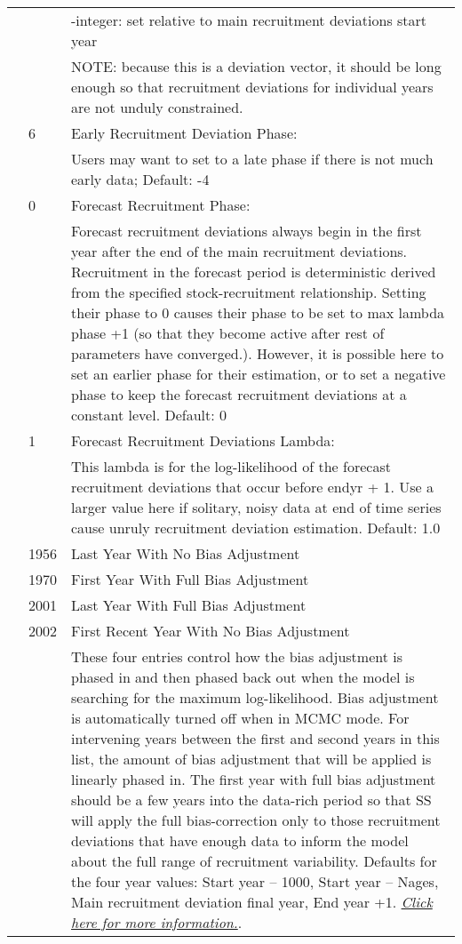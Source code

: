 \begin{center}
\begin{longtable}{p{1cm} p{3cm} p{11cm}}
		&  & -integer:  set relative to main recruitment deviations start year\\
		&  & NOTE:  because this is a deviation vector, it should be long enough so that recruitment deviations for individual years are not unduly constrained. \\
		& 6 & Early Recruitment Deviation Phase: \\
		& & Users may want to set to a late phase if there is not much early data; Default:  -4\\
		& 0 & Forecast Recruitment Phase: \\
		& & Forecast recruitment deviations always begin in the first year after the end of the main recruitment deviations. Recruitment in the forecast period is deterministic derived from the specified stock-recruitment relationship.  Setting their phase to 0 causes their phase to be set to max lambda phase +1 (so that they become active after rest of parameters have converged.).  However, it is possible here to set an earlier phase for their estimation, or to set a negative phase to keep the forecast recruitment deviations at a constant level. Default:  0 \\
		& 1 & Forecast Recruitment Deviations Lambda:\\
		&   & This lambda is for the log-likelihood of the forecast recruitment deviations that occur before endyr + 1.  Use a larger value here if solitary, noisy data at end of time series cause unruly recruitment deviation estimation. Default:  1.0 \\
		& 1956 & Last Year With No Bias Adjustment \\
		& 1970 & First Year With Full Bias Adjustment \\
		& 2001 & Last Year With Full Bias Adjustment \\
		& 2002 & First Recent Year With No Bias Adjustment \\
		&      & These four entries control how the bias adjustment is phased in and then phased back out when the model is searching for the maximum log-likelihood.  Bias adjustment is automatically turned off when in MCMC mode.  For intervening years between the first and second years in this list, the amount of bias adjustment that will be applied is linearly phased in.  The first year with full bias adjustment should be a few years into the data-rich period so that SS will apply the full bias-correction only to those recruitment deviations that have enough data to inform the model about the full range of recruitment variability.  Defaults for the four year values: Start year – 1000, Start year – Nages, Main recruitment deviation final year, End year +1. \hyperlink{RecBias}{\textit{Click here for more information.}}.\\

\end{longtable}
\end{center}
